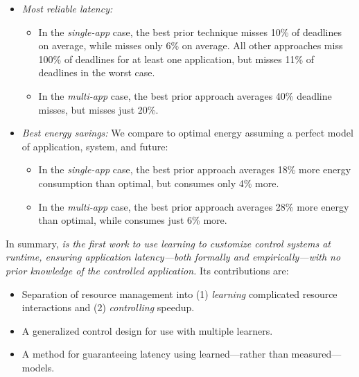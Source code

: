 \begin{itemize}[leftmargin=1em]
\item \textit{Most reliable latency:}
  \begin{itemize}[leftmargin=1em]
  \item In the \emph{single-app} case, the best prior technique misses
    10\% of deadlines on average, while \SYSTEM{} misses only 6\% on
    average. All other approaches miss 100\% of deadlines for at least
    one application, but \SYSTEM{} misses 11\% of deadlines in the
    worst case.
  \item In the \emph{multi-app} case, the best prior approach averages
    40\% deadline misses, but \SYSTEM{} misses just 20\%.
  \end{itemize}
\item \textit{Best energy savings:} We compare to optimal energy
  assuming a perfect model of application, system, and future:
  \begin{itemize}[leftmargin=1em]
  \item In the \emph{single-app} case, the best prior approach
    averages 18\% more energy consumption than optimal, but \SYSTEM{}
    consumes only 4\% more.
  \item In the \emph{multi-app} case, the best prior approach averages
    28\% more energy than optimal, while \SYSTEM{} consumes just 6\%
    more.
  \end{itemize}
\end{itemize}

In summary, \emph{\SYSTEM{} is the first work to use learning to
  customize control systems at runtime, ensuring application
  latency---both formally and empirically---with no prior
  knowledge of the controlled application.}  Its contributions are:
\begin{itemize}[leftmargin=1em]
\item Separation of resource management into (1) \emph{learning}
  complicated resource interactions and (2) \emph{controlling}
  speedup.
\item A generalized control design for use with multiple learners.
\item A method for guaranteeing latency using learned---rather
  than measured---models.
\end{itemize}


